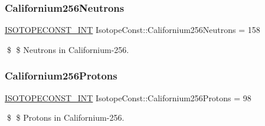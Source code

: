 \subsubsection{\texorpdfstring{Californium256\+Neutrons}{Californium256Neutrons}}
{\footnotesize\ttfamily \mbox{\hyperlink{group___isotope_const-_macros_ga5f18360b3e99483a35c32d789e62621c}{I\+S\+O\+T\+O\+P\+E\+C\+O\+N\+S\+T\+\_\+\+I\+NT}} Isotope\+Const\+::\+Californium256\+Neutrons = 158}

\$ \$ Neutrons in Californium-\/256. \mbox{\label{group___isotope_const-_californium-_cf256_gaa07bbb0acc3dd8cf9d898ca97b81db21}} 
\subsubsection{\texorpdfstring{Californium256\+Protons}{Californium256Protons}}
{\footnotesize\ttfamily \mbox{\hyperlink{group___isotope_const-_macros_ga5f18360b3e99483a35c32d789e62621c}{I\+S\+O\+T\+O\+P\+E\+C\+O\+N\+S\+T\+\_\+\+I\+NT}} Isotope\+Const\+::\+Californium256\+Protons = 98}

\$ \$ Protons in Californium-\/256. 